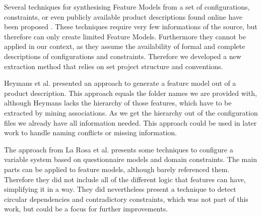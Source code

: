 

Several techniques for synthesising Feature Models from a set of configurations, constraints, or even publicly available product descriptions found online have been proposed \cite{zhang2013mining, becan2014webfml, davril2013feature}. These techniques require very few informations of the source, but therefore can only create limited Feature Models. Furthermore they cannot be applied in our context, as they assume the availability of formal and complete descriptions of configurations and constraints. Therefore we developed a new extraction method that relies on set project structure and conventions.

Heymans et al. \cite{davril2013feature} presented an approach to generate a feature model out of a product description. This approach equals the folder names we are provided with, although Heymans lacks the hierarchy of those features, which have to be extracted by mining associations. As we get the hierarchy out of the configuration files we already have all information needed. This approach could be used in later work to handle naming conflicts or missing information.

The approach from La Rosa et al. \cite{qbvm} presents some techniques to configure a variable system based on questionnaire models and domain constraints. The main parts can be applied to feature models, although barely referenced them. Therefore they did not include all of the different logic that features can have, simplifying it in a way. They did nevertheless present a technique to detect circular dependencies and contradictory constraints, which was not part of this work, but could be a focus for further improvements.